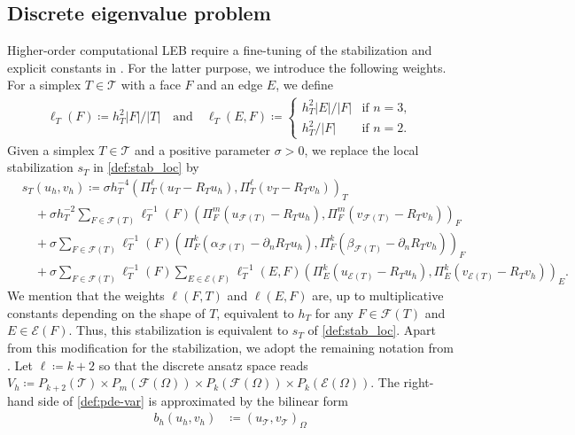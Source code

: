 \documentclass[a4paper]{amsart}
\numberwithin{equation}{section}
\def\F{\mathcal{F}}
\def\E{\mathcal{E}}
\def\T{\mathcal{T}}
\theoremstyle{definition}
\theoremstyle{remark}
\numberwithin{theorem}{section}
\numberwithin{equation}{section}
\numberwithin{table}{section}
\numberwithin{figure}{section}
\begin{document}
\subsection{Discrete eigenvalue problem}
Higher-order computational LEB require a fine-tuning of the stabilization and explicit constants in . For the latter purpose, we introduce the following weights. For a simplex $T \in \T$ with a face $F$ and an edge $E$, we define
\begin{align*}
    \ell_T(F) \coloneqq h_T^2|F|/|T| \quad\text{and}\quad \ell_T(E,F) \coloneqq \begin{cases}
        h_T^2|E|/|F| &\mbox{if } n = 3,\\
        h_T^2/|F| &\mbox{if } n = 2.
    \end{cases} 
\end{align*}
Given a simplex $T \in \T$ and a positive parameter $\sigma > 0$, we replace the local stabilization $s_T$ in \eqref{def:stab_loc} by
\begin{align}\label{def:stab-eig}
	&s_T(u_h,v_h) \coloneqq \sigma h_T^{-4} (\Pi_T^{\ell}(u_{T} - R_T u_h), \Pi_{T}^{\ell}(v_T - R_T v_h))_{T}\nonumber\\
	&\quad + \sigma h_T^{-2} \sum_{F \in \mathcal{F}(T)} \ell_T^{-1}(F)(\Pi_{F}^{m}(u_{\F(T)} - R_T u_h),\Pi_{F}^{m}(v_{\F(T)} - R_T v_h))_{F}\nonumber\\
	&\quad +\sigma\sum_{F\in\mathcal{F}(T)} \ell_T^{-1}(F)(\Pi_{F}^k(\alpha_{\F(T)} - \partial_n R_T u_h),\Pi_{F}^k(\beta_{\F(T)}-\partial_n R_T v_h))_{F}\\
	&\quad + \sigma \sum_{F \in \mathcal{F}(T)}\ell_T^{-1}(F)\sum_{E \in \E(F)} \ell_T^{-1}(E,F)(\Pi_{E}^{k}(u_{\E(T)} - R_T u_h), \Pi_{E}^{k}(v_{\E(T)} - R_T v_h))_{E}.\nonumber
\end{align}
We mention that the weights $\ell(F,T)$ and $\ell(E,F)$ are, up to multiplicative constants depending on the shape of $T$, equivalent to $h_T$ for any $F \in \F(T)$ and $E \in \E(F)$. Thus, this stabilization is equivalent to $s_T$ of \eqref{def:stab_loc}.
Apart from this modification for the stabilization, we adopt the remaining notation from .
Let $\ell \coloneqq k+2$ so that the discrete ansatz space reads $V_h \coloneqq P_{k+2}(\T) \times P_m(\F(\Omega)) \times P_k(\F(\Omega)) \times P_k(\E(\Omega))$.
The right-hand side of \eqref{def:pde-var} is approximated by the bilinear form
\begin{align*}
	b_h(u_h,v_h) &\coloneqq (u_\T,v_\T)_\Omega
\end{align*}
\end{document}
